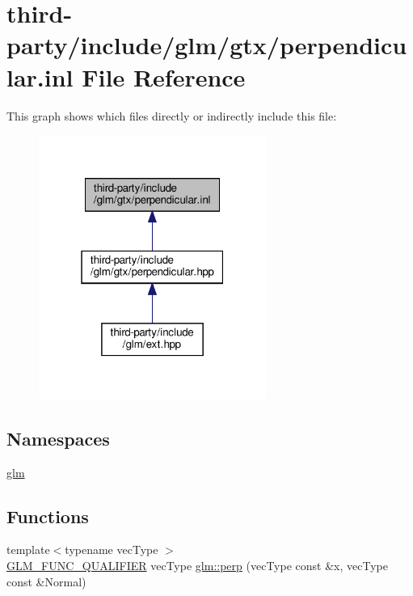 \hypertarget{perpendicular_8inl}{}\section{third-\/party/include/glm/gtx/perpendicular.inl File Reference}
\label{perpendicular_8inl}
This graph shows which files directly or indirectly include this file\+:
\nopagebreak
\begin{figure}[H]
\begin{center}
\leavevmode
\includegraphics[width=211pt]{perpendicular_8inl__dep__incl}
\end{center}
\end{figure}
\subsection*{Namespaces}
\begin{DoxyCompactItemize}
\item 
 \hyperlink{namespaceglm}{glm}
\end{DoxyCompactItemize}
\subsection*{Functions}
\begin{DoxyCompactItemize}
\item 
{\footnotesize template$<$typename vec\+Type $>$ }\\\hyperlink{setup_8hpp_a33fdea6f91c5f834105f7415e2a64407}{G\+L\+M\+\_\+\+F\+U\+N\+C\+\_\+\+Q\+U\+A\+L\+I\+F\+I\+ER} vec\+Type \hyperlink{group__gtx__perpendicular_ga41f8c73da9798a18e6b1e32f1e301f07}{glm\+::perp} (vec\+Type const \&x, vec\+Type const \&Normal)
\end{DoxyCompactItemize}
